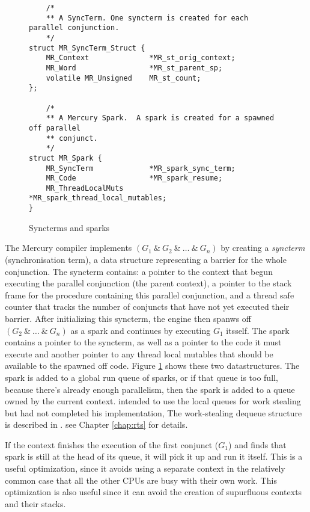 \begin{figure}
\begin{verbatim}
    /*
    ** A SyncTerm. One syncterm is created for each parallel conjunction.
    */
struct MR_SyncTerm_Struct {
    MR_Context              *MR_st_orig_context;
    MR_Word                 *MR_st_parent_sp;
    volatile MR_Unsigned    MR_st_count;
};

    /*
    ** A Mercury Spark.  A spark is created for a spawned off parallel
    ** conjunct.
    */
struct MR_Spark {
    MR_SyncTerm             *MR_spark_sync_term;
    MR_Code                 *MR_spark_resume;
    MR_ThreadLocalMuts      *MR_spark_thread_local_mutables;
}
\end{verbatim}
\caption{Syncterms and sparks}
\label{fig:spark_and_syncterm}
\end{figure}

The Mercury compiler implements $(G_1~\&~G_2~\&~\ldots~\&~G_n)$
by creating a \emph{syncterm} (synchronisation term), a data structure
representing a barrier for the whole conjunction.
The syncterm contains:
a pointer to the context that begun executing the parallel conjunction
(the parent context),
a pointer to the stack frame for the procedure containing this parallel
conjunction,
and a thread safe counter that tracks the number of conjuncts that have not
yet executed their barrier.
After initializing this syncterm, the engine then
spanws off $(G_2~\&~\ldots~\&~G_n)$ as a spark and continues by executing
$G_1$ itsself.
The spark contains a pointer to the syncterm,
as well as a pointer to the code it must execute
and another pointer to any thread local mutables that should be available to the
spawned off code.
Figure \ref{fig:spark_and_syncterm} shows these two datastructures.
The spark is added to a global run queue of sparks, or if that queue is too
full, because there's already enough parallelism,
then the spark is added to a queue owned by the current context.
\citet{wang_hons_thesis} intended to use the local queues for work stealing
but had not completed his implementation,
The work-stealing dequeue structure
is described in \cite{Chase_2005_wsdeque}.
see Chapter \ref{chap:rts} for details.

If the context finishes the execution of the first conjunct ($G_1$)
and finds that spark is still at the head of its queue,
it will pick it up and run it itself.
This is a useful optimization,
since it avoids using a separate context in the relatively common case
that all the other CPUs are busy with their own work.
This optimization is also useful since it can avoid the creation of supurfluous
contexts and their stacks.

